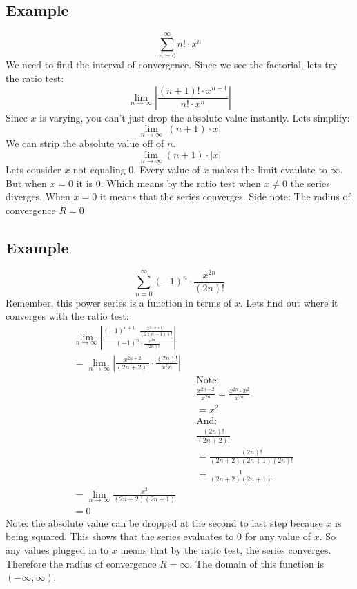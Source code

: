 \documentclass{article}
\begin{document}
    \subsection{Example}
        \[\sum_{n=0}^{\infty} n! \cdot x^n \]
        We need to find the interval of convergence.
        Since we see the factorial, lets try the ratio test:
        \[\lim_{n \to \infty} \left| \frac{(n+1)!\cdot x^{n-1}}{n! \cdot x^n}\right|\]
        Since \(x\) is varying, you can't just drop the absolute value instantly.
        Lets simplify:
        \[\lim_{n \to \infty} \left| (n+1) \cdot x\right|\]
        We can strip the absolute value off of \(n\).
        \[\lim_{n \to \infty} (n+1) \cdot |x| \]
        Lets consider \(x\) not equaling 0. 
        Every value of \(x\) makes the limit evaulate to \(\infty\).
        But when \(x = 0\) it is 0.
        Which means by the ratio test when \(x \neq 0\) the series diverges.
        When \(x = 0\) it means that the series converges.
        Side note: The radius of convergence \(R = 0\) 
    
    \subsection{Example}
        \[\sum_{n=0}^{\infty}  (-1)^n \cdot \frac{x^{2n}}{(2n)!}\]
        Remember, this power series is a function in terms of \(x\).
        Lets find out where it converges with the ratio test:
        \begin{align*}
            &\lim_{n \to \infty} \left| \frac{(-1)^{n+1} \cdot \frac{x^{2(n+1)}}{(2(n+1))!}}{(-1)^n \cdot \frac{x^{2n}}{(2n)!}}\right| \\
            &= \lim_{n \to \infty}  \left| \frac{x^{2n+2}}{(2n+2)!} \cdot \frac{(2n)!}{x^2n}\right| \\
            && & \text{Note:} \\
            && & \frac{x^{2n+2}}{x^{2n}} = \frac{x^{2n} \cdot x^2}{x^{2n}} \\
            && &= x^2 \\
            && & \text{And:} \\
            && & \frac{(2n)!}{(2n + 2)!} \\
            && &= \frac{(2n)!}{(2n+2)(2n+1)(2n)!} \\
            && &= \frac{1}{(2n+2)(2n+1)} \\
            &= \lim_{n \to \infty} \frac{x^2}{(2n+2)(2n+1)} \\
            &= 0
        \end{align*}
        Note: the absolute value can be dropped at the second to last step because \(x\) is being squared.
        This shows that the series evaluates to 0 for any value of \(x\).
        So any values plugged in to \(x\) means that by the ratio test, the series converges.
        Therefore the radius of convergence \(R = \infty\).
        The domain of this function is \((-\infty, \infty)\).
        
\end{document}
